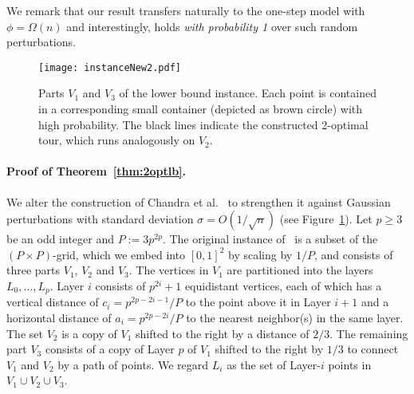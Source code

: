 \documentclass[11pt,DIV=12,a4paper]{scrartcl}
\newcommand{\TSP}{\mathsf{TSP}}
\begin{document}
We remark that our result transfers naturally to the one-step model with $\phi = \Omega(n)$ and interestingly, holds \emph{with probability 1} over such random perturbations.


\begin{figure}
\texttt{[image: instanceNew2.pdf]}
\caption{Parts $V_1$ and $V_3$ of the lower bound instance. Each point is contained in a corresponding small container (depicted as brown circle) with high probability. The black lines indicate the constructed 2-optimal tour, which runs analogously on $V_2$.}
\label{fig:CKTconstruction}
\end{figure}


\paragraph{Proof of Theorem~\ref{thm:2optlb}.}
 We alter the construction of Chandra et al.~\cite{ChandraEA:OldOpt:1999} to strengthen it against Gaussian perturbations with standard deviation $\sigma = O(1/\sqrt{n})$ (see Figure~\ref{fig:CKTconstruction}). Let $p\ge 3$ be an odd integer and $P := 3p^{2p}$. The original instance of~\cite{ChandraEA:OldOpt:1999} is a subset of the $(P\times P)$-grid, which we embed into $[0,1]^2$ by scaling by $1/P$, and consists of three parts $V_1$, $V_2$ and $V_3$. The vertices in $V_1$ are partitioned into the layers $L_0,\dots,L_p$. Layer $i$ consists of $p^{2i} + 1$ equidistant vertices, each of which has a vertical distance of $c_i = p^{2p-2i-1}/P$ to the point above it in Layer $i+1$ and a horizontal distance of $a_i = p^{2p-2i}/P$ to the nearest neighbor(s) in the same layer. The set $V_2$ is a copy of $V_1$ shifted to the right by a distance of $2/3$. The remaining part $V_3$ consists of a copy of Layer $p$ of $V_1$ shifted to the right by $1/3$ to connect $V_1$ and $V_2$ by a path of points. We regard $L_i$ as the set of Layer-$i$ points in $V_1\cup V_2 \cup V_3$.
\end{document}
